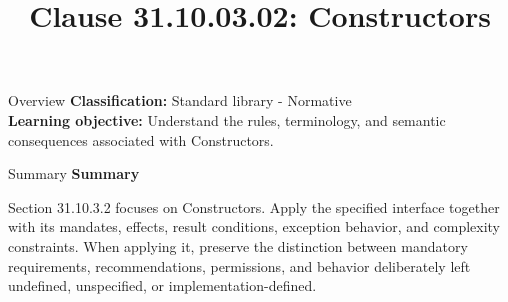 \documentclass[10pt,letterpaper]{article}
\title{Clause 31.10.03.02: Constructors}
\author{}
\date{}
\begin{document}
\maketitle
\begin{CornellOverviewBox}{Overview}
\textbf{Classification:} Standard library - Normative\\[2pt]
\textbf{Learning objective:} Understand the rules, terminology, and semantic consequences associated with Constructors.
\end{CornellOverviewBox}\begin{CornellSummaryBox}{Summary}
{\sffamily\bfseries\color{Accent} Summary}\par\vspace{3pt}Section 31.10.3.2 focuses on Constructors. Apply the specified interface together with its mandates, effects, result conditions, exception behavior, and complexity constraints. When applying it, preserve the distinction between mandatory requirements, recommendations, permissions, and behavior deliberately left undefined, unspecified, or implementation-defined.
\end{CornellSummaryBox}
\end{document}
